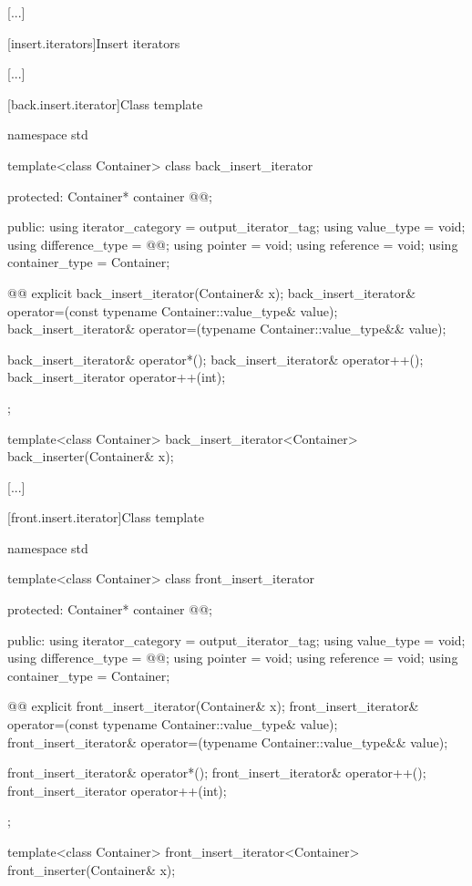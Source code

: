 [...]

[insert.iterators]{Insert iterators}

[...]

[back.insert.iterator]{Class template }

%
\begin{codeblock}
namespace std {
  template<class Container>
  class back_insert_iterator {
  protected:
    Container* container @@;

  public:
    using iterator_category = output_iterator_tag;
    using value_type        = void;
    using difference_type   = @@;
    using pointer           = void;
    using reference         = void;
    using container_type    = Container;

    @@
    explicit back_insert_iterator(Container& x);
    back_insert_iterator& operator=(const typename Container::value_type& value);
    back_insert_iterator& operator=(typename Container::value_type&& value);

    back_insert_iterator& operator*();
    back_insert_iterator& operator++();
    back_insert_iterator  operator++(int);
  };

  template<class Container>
    back_insert_iterator<Container> back_inserter(Container& x);
}
\end{codeblock}

[...]

[front.insert.iterator]{Class template }

%
\begin{codeblock}
namespace std {
  template<class Container>
  class front_insert_iterator {
  protected:
    Container* container @@;

  public:
    using iterator_category = output_iterator_tag;
    using value_type        = void;
    using difference_type   = @@;
    using pointer           = void;
    using reference         = void;
    using container_type    = Container;

    @@
    explicit front_insert_iterator(Container& x);
    front_insert_iterator& operator=(const typename Container::value_type& value);
    front_insert_iterator& operator=(typename Container::value_type&& value);

    front_insert_iterator& operator*();
    front_insert_iterator& operator++();
    front_insert_iterator  operator++(int);
  };

  template<class Container>
    front_insert_iterator<Container> front_inserter(Container& x);
}
\end{codeblock}

